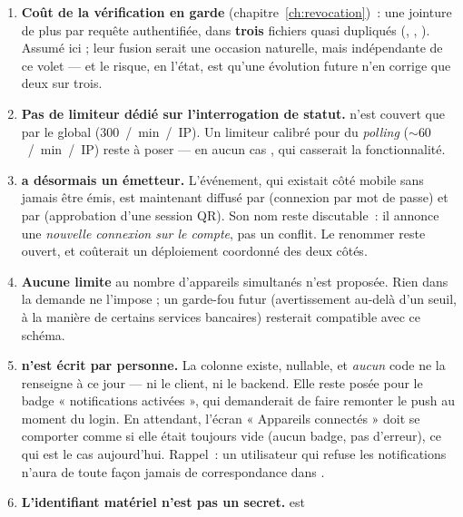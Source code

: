 \begin{enumerate}[leftmargin=1.6em]
  \item \textbf{Coût de la vérification en garde} (chapitre~\ref{ch:revocation})~:
        une jointure de plus par requête authentifiée, dans \textbf{trois} fichiers quasi
        dupliqués (, , ).
        Assumé ici ; leur fusion serait une occasion naturelle, mais indépendante de ce
        volet --- et le risque, en l'état, est qu'une évolution future n'en corrige que
        deux sur trois.
  \item \textbf{Pas de limiteur dédié sur l'interrogation de statut.}
         n'est couvert que par le
         global (300~/~min~/~IP). Un limiteur calibré pour du
        \emph{polling} (${\sim}60$~/~min~/~IP) reste à poser --- en aucun cas
        , qui casserait la fonctionnalité.
  \item \textbf{ a désormais un émetteur.} L'événement, qui existait
        côté mobile sans jamais être émis, est maintenant diffusé par
         (connexion par mot de passe) et par
         (approbation d'une session QR). Son nom reste
        discutable~: il annonce une \emph{nouvelle connexion sur le compte}, pas un
        conflit. Le renommer reste ouvert, et coûterait un déploiement coordonné des deux
        côtés.
  \item \textbf{Aucune limite} au nombre d'appareils simultanés n'est proposée. Rien dans
        la demande ne l'impose ; un garde-fou futur (avertissement au-delà d'un seuil, à
        la manière de certains services bancaires) resterait compatible avec ce schéma.
  \item \textbf{ n'est écrit par personne.} La colonne existe,
        nullable, et \emph{aucun} code ne la renseigne à ce jour --- ni le client, ni le
        backend. Elle reste posée pour le badge « notifications activées », qui demanderait
        de faire remonter le  push au moment du login. En attendant, l'écran
        « Appareils connectés » doit se comporter comme si elle était toujours vide (aucun
        badge, pas d'erreur), ce qui est le cas aujourd'hui. Rappel~: un utilisateur qui
        refuse les notifications n'aura de toute façon jamais de correspondance dans
        .
  \item \textbf{L'identifiant matériel n'est pas un secret.}  est

\end{enumerate}
